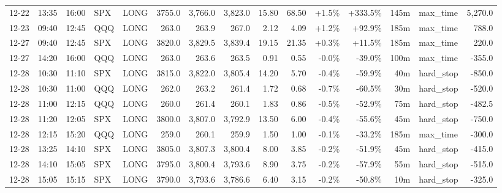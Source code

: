 \documentclass[11pt,a4paper,twoside]{article}
\begin{document}
\begin{landscape}
\begin{center}
\begin{longtable}{>{\color{txtmain}}l l l l l r r r r r r r r >{\color{txtmain}}l r}
12-22 & 13:35 & 16:00 & SPX & LONG & 3755.0 & 3,766.0 & 3,823.0 & 15.80 & 68.50 & \textcolor{wingreen}{+1.5\%} & \textcolor{wingreen}{+333.5\%} & 145m & max\_time & \textcolor{wingreen}{5,270.0} \\
12-23 & 09:40 & 12:45 & QQQ & LONG & 263.0 & 263.9 & 267.0 & 2.12 & 4.09 & \textcolor{wingreen}{+1.2\%} & \textcolor{wingreen}{+92.9\%} & 185m & max\_time & \textcolor{wingreen}{788.0} \\
12-27 & 09:40 & 12:45 & SPX & LONG & 3820.0 & 3,829.5 & 3,839.4 & 19.15 & 21.35 & \textcolor{wingreen}{+0.3\%} & \textcolor{wingreen}{+11.5\%} & 185m & max\_time & \textcolor{wingreen}{220.0} \\
12-27 & 14:20 & 16:00 & QQQ & LONG & 263.0 & 263.6 & 263.5 & 0.91 & 0.55 & \textcolor{lossred}{-0.0\%} & \textcolor{lossred}{-39.0\%} & 100m & max\_time & \textcolor{lossred}{-355.0} \\
12-28 & 10:30 & 11:10 & SPX & LONG & 3815.0 & 3,822.0 & 3,805.4 & 14.20 & 5.70 & \textcolor{lossred}{-0.4\%} & \textcolor{lossred}{-59.9\%} & 40m & hard\_stop & \textcolor{lossred}{-850.0} \\
12-28 & 10:30 & 11:00 & QQQ & LONG & 262.0 & 263.2 & 261.4 & 1.72 & 0.68 & \textcolor{lossred}{-0.7\%} & \textcolor{lossred}{-60.5\%} & 30m & hard\_stop & \textcolor{lossred}{-520.0} \\
12-28 & 11:00 & 12:15 & QQQ & LONG & 260.0 & 261.4 & 260.1 & 1.83 & 0.86 & \textcolor{lossred}{-0.5\%} & \textcolor{lossred}{-52.9\%} & 75m & hard\_stop & \textcolor{lossred}{-482.5} \\
12-28 & 11:20 & 12:05 & SPX & LONG & 3800.0 & 3,807.0 & 3,792.9 & 13.50 & 6.00 & \textcolor{lossred}{-0.4\%} & \textcolor{lossred}{-55.6\%} & 45m & hard\_stop & \textcolor{lossred}{-750.0} \\
12-28 & 12:15 & 15:20 & QQQ & LONG & 259.0 & 260.1 & 259.9 & 1.50 & 1.00 & \textcolor{lossred}{-0.1\%} & \textcolor{lossred}{-33.2\%} & 185m & max\_time & \textcolor{lossred}{-300.0} \\
12-28 & 13:25 & 14:10 & SPX & LONG & 3805.0 & 3,807.3 & 3,800.4 & 8.00 & 3.85 & \textcolor{lossred}{-0.2\%} & \textcolor{lossred}{-51.9\%} & 45m & hard\_stop & \textcolor{lossred}{-415.0} \\
12-28 & 14:10 & 15:05 & SPX & LONG & 3795.0 & 3,800.4 & 3,793.6 & 8.90 & 3.75 & \textcolor{lossred}{-0.2\%} & \textcolor{lossred}{-57.9\%} & 55m & hard\_stop & \textcolor{lossred}{-515.0} \\
12-28 & 15:05 & 15:15 & SPX & LONG & 3790.0 & 3,793.6 & 3,786.6 & 6.40 & 3.15 & \textcolor{lossred}{-0.2\%} & \textcolor{lossred}{-50.8\%} & 10m & hard\_stop & \textcolor{lossred}{-325.0} \\

\end{longtable}
\end{center}
\end{landscape}
\end{document}
